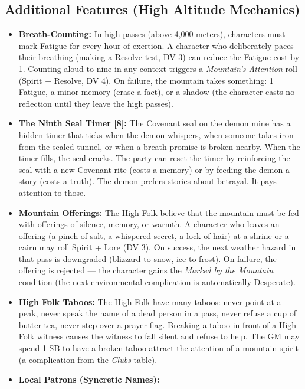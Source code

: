 \subsection*{Additional Features (High Altitude Mechanics)}
\label{sec:himadri-mechanics}

\begin{itemize}
\item \textbf{Breath-Counting:} In high passes (above 4,000 meters), characters must mark Fatigue for every hour of exertion. A character who deliberately paces their breathing (making a Resolve test, DV 3) can reduce the Fatigue cost by 1. Counting aloud to nine in any context triggers a \emph{Mountain's Attention} roll (Spirit + Resolve, DV 4). On failure, the mountain takes something: 1 Fatigue, a minor memory (erase a fact), or a shadow (the character casts no reflection until they leave the high passes).
\item \textbf{The Ninth Seal Timer [8]:} The Covenant seal on the demon mine has a hidden timer that ticks when the demon whispers, when someone takes iron from the sealed tunnel, or when a breath-promise is broken nearby. When the timer fills, the seal cracks. The party can reset the timer by reinforcing the seal with a new Covenant rite (costs a memory) or by feeding the demon a story (costs a truth). The demon prefers stories about betrayal. It pays attention to those.
\item \textbf{Mountain Offerings:} The High Folk believe that the mountain must be fed with offerings of silence, memory, or warmth. A character who leaves an offering (a pinch of salt, a whispered secret, a lock of hair) at a shrine or a cairn may roll Spirit + Lore (DV 3). On success, the next weather hazard in that pass is downgraded (blizzard to snow, ice to frost). On failure, the offering is rejected --- the character gains the \emph{Marked by the Mountain} condition (the next environmental complication is automatically Desperate).
\item \textbf{High Folk Taboos:} The High Folk have many taboos: never point at a peak, never speak the name of a dead person in a pass, never refuse a cup of butter tea, never step over a prayer flag. Breaking a taboo in front of a High Folk witness causes the witness to fall silent and refuse to help. The GM may spend 1 SB to have a broken taboo attract the attention of a mountain spirit (a complication from the \emph{Clubs} table).
\item \textbf{Local Patrons (Syncretic Names):}
  \begin{itemize}

\end{itemize}
\end{itemize}
